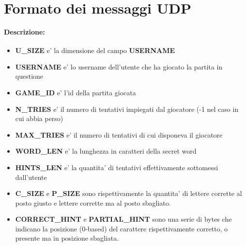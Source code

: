 \section{Formato dei messaggi UDP}
\label{appendix:udp_format}

\begin{lrbox}{\asciiart}
	\begin{varwidth}{\maxdimen}
		\noindent
	\end{varwidth}
\end{lrbox}%

\begin{center}
	\begin{figure}[h]
		\makebox[\textwidth]{\showasciiart{80ex}}
	\end{figure}
\end{center}

\paragraph{Descrizione:}
\begin{itemize}
	\item \textbf{U\_SIZE} e' la dimensione del campo \textbf{USERNAME}
	\item \textbf{USERNAME} e' lo username dell'utente che ha giocato la partita in questione
	\item \textbf{GAME\_ID} e' l'id della partita giocata
	\item \textbf{N\_TRIES} e' il numero di tentativi impiegati dal giocatore (-1 nel caso in cui abbia perso)
	\item \textbf{MAX\_TRIES} e' il numero di tentativi di cui disponeva il giocatore
	\item \textbf{WORD\_LEN} e' la lunghezza in caratteri della secret word
	\item \textbf{HINTS\_LEN} e' la quantita' di tentativi effettivamente sottomessi dall'utente
	\item \textbf{C\_SIZE} e \textbf{P\_SIZE} sono rispettivamente la quantita' di lettere corrette al posto giusto e lettere corrette ma al posto sbagliato.
	\item \textbf{CORRECT\_HINT} e \textbf{PARTIAL\_HINT} sono una serie di bytes che indicano la posizione (0-based) del carattere rispettivamente corretto, o presente ma in posizione sbagliata.
\end{itemize}